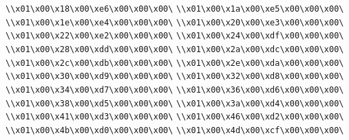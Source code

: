 \verb|\\x01\x00\x18\x00\xe6\x00\x00\x00\|\newline
\verb|\\x01\x00\x1a\x00\xe5\x00\x00\x00\|\newline
\verb|\\x01\x00\x1e\x00\xe4\x00\x00\x00\|\newline
\verb|\\x01\x00\x20\x00\xe3\x00\x00\x00\|\newline
\verb|\\x01\x00\x22\x00\xe2\x00\x00\x00\|\newline
\verb|\\x01\x00\x24\x00\xdf\x00\x00\x00\|\newline
\verb|\\x01\x00\x28\x00\xdd\x00\x00\x00\|\newline
\verb|\\x01\x00\x2a\x00\xdc\x00\x00\x00\|\newline
\verb|\\x01\x00\x2c\x00\xdb\x00\x00\x00\|\newline
\verb|\\x01\x00\x2e\x00\xda\x00\x00\x00\|\newline
\verb|\\x01\x00\x30\x00\xd9\x00\x00\x00\|\newline
\verb|\\x01\x00\x32\x00\xd8\x00\x00\x00\|\newline
\verb|\\x01\x00\x34\x00\xd7\x00\x00\x00\|\newline
\verb|\\x01\x00\x36\x00\xd6\x00\x00\x00\|\newline
\verb|\\x01\x00\x38\x00\xd5\x00\x00\x00\|\newline
\verb|\\x01\x00\x3a\x00\xd4\x00\x00\x00\|\newline
\verb|\\x01\x00\x41\x00\xd3\x00\x00\x00\|\newline
\verb|\\x01\x00\x46\x00\xd2\x00\x00\x00\|\newline
\verb|\\x01\x00\x4b\x00\xd0\x00\x00\x00\|\newline
\verb|\\x01\x00\x4d\x00\xcf\x00\x00\x00\|\newline
